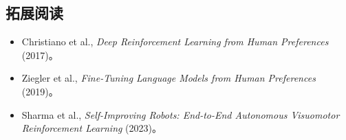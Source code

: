 \documentclass[a4paper]{article}
\begin{document}
\subsection{拓展阅读}
\begin{itemize}
    \item Christiano et al., \textit{Deep Reinforcement Learning from Human Preferences} (2017)。
    \item Ziegler et al., \textit{Fine-Tuning Language Models from Human Preferences} (2019)。
    \item Sharma et al., \textit{Self-Improving Robots: End-to-End Autonomous Visuomotor Reinforcement Learning} (2023)。
\end{itemize}
\end{document}
